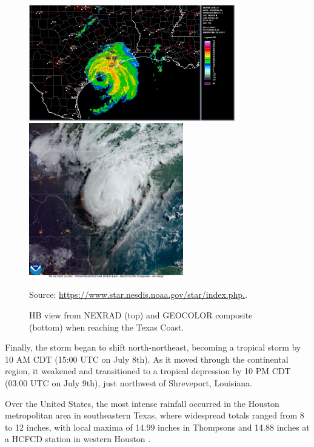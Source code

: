 \begin{figure}[h!]
	\centering
	\caption{HB view from NEXRAD (top) and GEOCOLOR composite (bottom) when reaching the Texas Coast.}
	\label{fig:nexradgeocolor}
	\includegraphics[width=0.8\textwidth]{docs/figuras/chapter5/20240708-0814Z-HGX.png}
	\vspace{3mm}
	\includegraphics[width=0.6\textwidth]{docs/figuras/chapter5/20241901240_GOES16-ABI-FL-GEOCOLOR-AL022024-2000x2000.jpg}
	
	\centering
	Source: \url{https://www.star.nesdis.noaa.gov/star/index.php.}.
\end{figure}

Finally, the storm began to shift north-northeast, becoming a tropical storm by 10 AM CDT (15:00 UTC on July 8th). As it moved through the continental region, it weakened and transitioned to a tropical depression by 10 PM CDT (03:00 UTC on July 9th), just northwest of Shreveport, Louisiana.

Over the United States, the most intense rainfall occurred in the Houston metropolitan area in southeastern Texas, where widespread totals ranged from 8 to 12 inches, with local maxima of 14.99 inches in Thompsons and 14.88 inches at a HCFCD station in western Houston \cite{li2025generative}.

